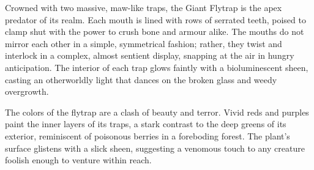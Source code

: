 Crowned with two massive, maw-like traps, the Giant Flytrap is the apex predator of its realm. Each mouth is lined with rows of serrated teeth, poised to clamp shut with the power to crush bone and armour alike. The mouths do not mirror each other in a simple, symmetrical fashion; rather, they twist and interlock in a complex, almost sentient display, snapping at the air in hungry anticipation. The interior of each trap glows faintly with a bioluminescent sheen, casting an otherworldly light that dances on the broken glass and weedy overgrowth.

The colors of the flytrap are a clash of beauty and terror. Vivid reds and purples paint the inner layers of its traps, a stark contrast to the deep greens of its exterior, reminiscent of poisonous berries in a foreboding forest. The plant's surface glistens with a slick sheen, suggesting a venomous touch to any creature foolish enough to venture within reach.

